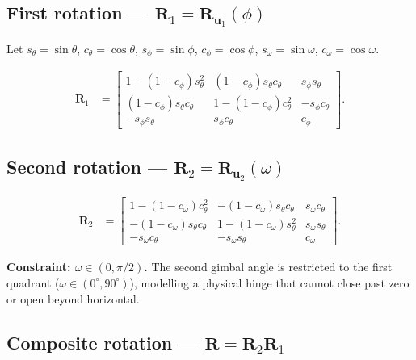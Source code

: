 \documentclass[12pt,a4paper]{article}
\newcommand{\uva}{\mathbf{u}_1}
\newcommand{\uvb}{\mathbf{u}_2}
\newcommand{\Rd}{\mathbf{R}}
\newcommand{\Rone}{\Rd_1}
\newcommand{\Rtwo}{\Rd_2}
\newcommand{\Rcom}{\Rd}
\begin{document}
\subsection{First rotation --- \texorpdfstring{$\Rone = \Rd_{\uva}(\phi)$}{R1 = R\_u1(phi)}}

Let $s_\theta = \sin\theta$, $c_\theta = \cos\theta$, $s_\phi = \sin\phi$, $c_\phi = \cos\phi$,
$s_\omega = \sin\omega$, $c_\omega = \cos\omega$.

\begin{align}
  \Rone &=
  \begin{bmatrix}
    1 - (1-c_\phi)s_\theta^2      & (1-c_\phi)s_\theta c_\theta &  s_\phi s_\theta  \\[2pt]
    (1-c_\phi)s_\theta c_\theta   & 1 - (1-c_\phi)c_\theta^2    & -s_\phi c_\theta  \\[2pt]
    -s_\phi s_\theta              &  s_\phi c_\theta            &  c_\phi
  \end{bmatrix}. \label{eq:R1}
\end{align}

\subsection{Second rotation --- \texorpdfstring{$\Rtwo = \Rd_{\uvb}(\omega)$}{R2 = R\_u2(omega)}}

\begin{align}
  \Rtwo &=
  \begin{bmatrix}
    1 - (1-c_\omega)c_\theta^2      & -(1-c_\omega)s_\theta c_\theta &  s_\omega c_\theta  \\[2pt]
    -(1-c_\omega)s_\theta c_\theta  &  1 - (1-c_\omega)s_\theta^2    &  s_\omega s_\theta  \\[2pt]
    -s_\omega c_\theta              & -s_\omega s_\theta             &  c_\omega
  \end{bmatrix}. \label{eq:R2}
\end{align}

\medskip
\noindent\textbf{Constraint: $\omega\in(0,\pi/2)$.}
The second gimbal angle is restricted to the first quadrant
($\omega \in (0^\circ, 90^\circ)$), modelling a physical hinge that cannot
close past zero or open beyond horizontal.
\medskip

\subsection{Composite rotation --- \texorpdfstring{$\Rcom = \Rtwo \Rone$}{R = R2 R1}}
\end{document}
